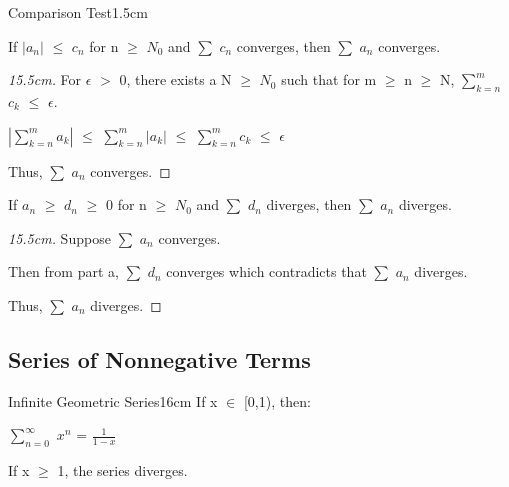     \begin{ltheorem}{Comparison Test}{1.5cm}
        \item If $|a_n|$ $\leq$ $c_n$ for n $\geq$ $N_0$ and
            $\sum$ $c_n$ converges, then $\sum$ $a_n$ converges.

            \begin{proof}[15.5cm]
                For $\epsilon$ $>$ 0, there exists a N $\geq$ $N_0$
                such that for m $\geq$ n $\geq$ N,
                $\sum_{k=n}^m$ $c_k$ $\leq$ $\epsilon$.

                \hspace{1cm}
                $| \sum_{k=n}^m a_k |$
                $\leq$ $\sum_{k=n}^m |a_k|$
                $\leq$ $\sum_{k=n}^m c_k$ $\leq$ $\epsilon$

                Thus, $\sum$ $a_n$ converges.
            \end{proof}
        
        \item If $a_n$ $\geq$ $d_n$ $\geq$ 0 for n $\geq$ $N_0$
            and $\sum$ $d_n$ diverges, then $\sum$ $a_n$ diverges.

            \begin{proof}[15.5cm]
                Suppose $\sum$ $a_n$ converges.

                Then from part a, $\sum$ $d_n$ converges which contradicts
                that $\sum$ $a_n$ diverges.
                
                Thus, $\sum$ $a_n$ diverges.
            \end{proof}
    \end{ltheorem}

    \vspace{0.5cm}





\subsection[ Non-negative Series ]{ Series of Nonnegative Terms }

    \begin{wtheorem}{Infinite Geometric Series}{16cm}
        If x $\in$ [0,1), then:

        \hspace{1cm}
        $\sum_{n=0}^{\infty}$ $x^n$
        = {\large $\frac{1}{1-x}$ }

        If x $\geq$ 1, the series diverges.
    \end{wtheorem}
    
